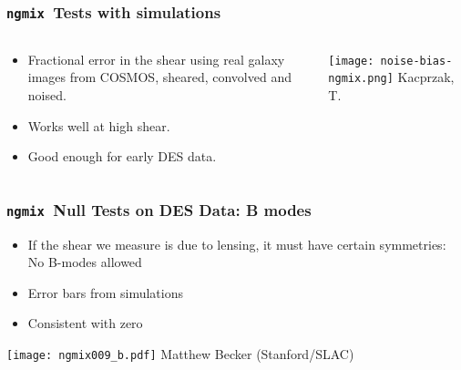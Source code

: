 \documentclass{beamer}
\newcommand{\ngmix}{\texttt{ngmix}}
\begin{document}
\frame
{
    \frametitle{\ngmix\ Tests with simulations}

    \fontsize{9}{0.8\baselineskip}
    \begin{columns}
        \begin{column}{0.3\textwidth}
            \begin{itemize}


                \item Fractional error in the shear using real galaxy
                    images from COSMOS, sheared, convolved and noised.

                \item Works well at high shear.

                \item Good enough for early DES data.

            \end{itemize}
        \end{column}
        \begin{column}{0.7\textwidth}
            \begin{center}
                \texttt{[image: noise-bias-ngmix.png]}
                \newline
                Kacprzak, T.
            \end{center}
        \end{column}
    \end{columns}

}


\frame
{
    \frametitle{\ngmix\ Null Tests on DES Data: B modes}

    \begin{itemize}

        \item If the shear we measure is due to lensing, it must have
            certain symmetries: No B-modes allowed

        \item Error bars from simulations
        
        \item Consistent with zero

    \end{itemize}

    \begin{center}
        \texttt{[image: ngmix009\_b.pdf]}
        \newline
        Matthew Becker (Stanford/SLAC)
    \end{center}

}
\end{document}
